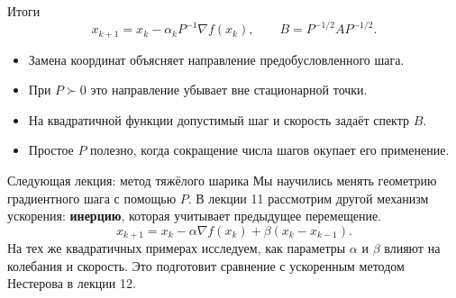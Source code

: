 \documentclass[aspectratio=169,10pt]{beamer}
\newcommand{\grad}{\nabla}
\begin{document}
\begin{frame}{Итоги}
\small
\[
\boxed{x_{k+1}=x_k-\alpha_kP^{-1}\grad f(x_k),\qquad
B=P^{-1/2}AP^{-1/2}.}
\]
\begin{itemize}
\item Замена координат объясняет направление предобусловленного шага.
\item При $P\succ0$ это направление убывает вне стационарной точки.
\item На квадратичной функции допустимый шаг и скорость задаёт спектр $B$.
\item Простое $P$ полезно, когда сокращение числа шагов окупает его применение.
\end{itemize}
\end{frame}

\begin{frame}{Следующая лекция: метод тяжёлого шарика}
\small
Мы научились менять геометрию градиентного шага с помощью $P$. В лекции 11 рассмотрим другой механизм ускорения: \textbf{инерцию}, которая учитывает предыдущее перемещение.
\[
\boxed{x_{k+1}=x_k-\alpha\grad f(x_k)+\beta(x_k-x_{k-1}).}
\]
На тех же квадратичных примерах исследуем, как параметры $\alpha$ и $\beta$ влияют на колебания и скорость. Это подготовит сравнение с ускоренным методом Нестерова в лекции 12.
\end{frame}
\end{document}
